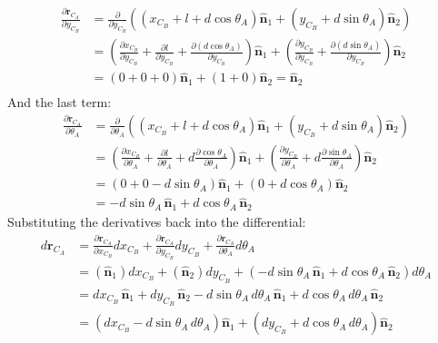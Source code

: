 \documentclass[titlepage]{article}
\begin{document}
\begin{equation}
	\begin{split}
		\frac{\partial\boldsymbol{r}_{C_A}}{\partial y_{C_B}}&=\frac{\partial}{\partial y_{C_B}}\left(\left(x_{C_B}+l+d\cos\theta_A\right)\hat{\boldsymbol{n}}_1+\left(y_{C_B}+d\sin\theta_A\right)\hat{\boldsymbol{n}}_2\right) \\
		&=\left(\frac{\partial x_{C_B}}{\partial y_{C_B}}+\frac{\partial l}{\partial y_{C_B}}+\frac{\partial (d\cos\theta_A)}{\partial y_{C_B}}\right)\hat{\boldsymbol{n}}_1+\left(\frac{\partial y_{C_B}}{\partial y_{C_B}}+\frac{\partial (d\sin\theta_A)}{\partial y_{C_B}}\right)\hat{\boldsymbol{n}}_2 \\
		&=\left(0+0+0\right)\hat{\boldsymbol{n}}_1+\left(1+0\right)\hat{\boldsymbol{n}}_2=\hat{\boldsymbol{n}}_2 \\
	\end{split}
\end{equation}
And the last term:
\begin{equation}
	\begin{split}
		\frac{\partial\boldsymbol{r}_{C_A}}{\partial \theta_A}&=\frac{\partial}{\partial \theta_A}\left(\left(x_{C_B}+l+d\cos\theta_A\right)\hat{\boldsymbol{n}}_1+\left(y_{C_B}+d\sin\theta_A\right)\hat{\boldsymbol{n}}_2\right) \\
		&=\left(\frac{\partial x_{C_B}}{\partial \theta_A}+\frac{\partial l}{\partial \theta_A}+d\frac{\partial \cos\theta_A}{\partial \theta_A}\right)\hat{\boldsymbol{n}}_1+\left(\frac{\partial y_{C_B}}{\partial \theta_A}+d\frac{\partial \sin\theta_A}{\partial \theta_A}\right)\hat{\boldsymbol{n}}_2 \\
		&=\left(0+0-d\sin\theta_A\right)\hat{\boldsymbol{n}}_1+\left(0+d\cos\theta_A\right)\hat{\boldsymbol{n}}_2 \\
		&=-d\sin\theta_A\,\hat{\boldsymbol{n}}_1+d\cos\theta_A\,\hat{\boldsymbol{n}}_2
	\end{split}
\end{equation}
Substituting the derivatives back into the differential:
\begin{equation}
	\begin{split}
		d\boldsymbol{r}_{C_A}&=\frac{\partial\boldsymbol{r}_{C_A}}{\partial x_{C_B}}dx_{C_B}+\frac{\partial\boldsymbol{r}_{C_A}}{\partial y_{C_B}}dy_{C_B}+\frac{\partial\boldsymbol{r}_{C_A}}{\partial \theta_A}d\theta_A \\
		&=\left(\hat{\boldsymbol{n}}_1\right)dx_{C_B}+\left(\hat{\boldsymbol{n}}_2\right)dy_{C_B}+\left(-d\sin\theta_A\,\hat{\boldsymbol{n}}_1+d\cos\theta_A\,\hat{\boldsymbol{n}}_2\right)d\theta_A \\
		&=dx_{C_B}\,\hat{\boldsymbol{n}}_1+dy_{C_B}\,\hat{\boldsymbol{n}}_2-d\sin\theta_A\,d\theta_A\,\hat{\boldsymbol{n}}_1+d\cos\theta_A\,d\theta_A\,\hat{\boldsymbol{n}}_2 \\
		&=\left(dx_{C_B}-d\sin\theta_A\,d\theta_A\right)\hat{\boldsymbol{n}}_1+\left(dy_{C_B}+d\cos\theta_A\,d\theta_A\right)\hat{\boldsymbol{n}}_2
	\end{split}
\end{equation}
\end{document}

